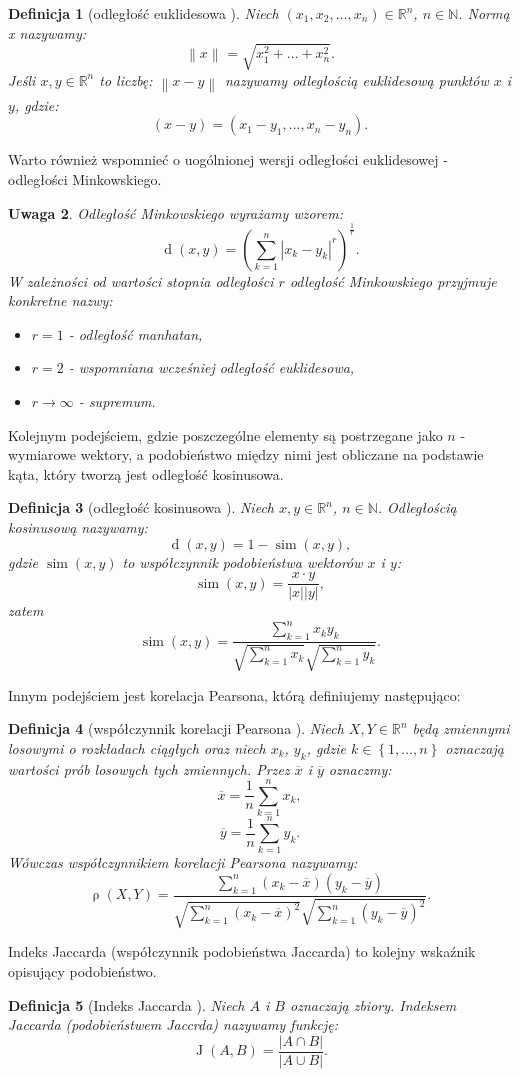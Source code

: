 \documentclass[12pt,a4paper]{report}
\newtheorem{df}{Definicja}[chapter]
\newtheorem{uwaga}[df]{Uwaga}
\newcommand{\set}[1]{\left\lbrace {#1} \right\rbrace}
\newcommand{\setR}{\mathbb{R}}
\newcommand{\setN}{\mathbb{N}}
\newcommand{\ro}[2]{\operatorname{\rho}\left( {#1},{#2} \right)}
\newcommand{\J}[2]{\operatorname{J}\left({#1}, {#2} \right)}
\newcommand{\similarity}[2]{\operatorname{sim}\left({#1}, {#2} \right)}
\newcommand{\distance}[2]{\operatorname{d}\left({#1}, {#2} \right)}
\newcommand{\norm}[2][]{\left\| {#2} \right\|_{#1}}
\begin{document}
\begin{df}[odległość euklidesowa \citep{rsh}]%

Niech $(x_1,x_2,\ldots,x_n) \in \setR^n $, $n \in\setN$.
Normą x nazywamy:
$$
\norm{x} = \sqrt{x_{1}^{2} + \ldots + x_{n}^{2}}.
$$
Jeśli $x,y \in \setR^n $ to liczbę:
$\norm{x-y}$ nazywamy odległością euklidesową punktów $x$ i $y$, gdzie:
$$
(x-y) = (x_1-y_1,\ldots ,x_n-y_n).
$$
\end{df}
Warto również wspomnieć o uogólnionej wersji odległości euklidesowej - odległości Minkowskiego.
\begin{uwaga}
Odległość Minkowskiego wyrażamy wzorem:
$$
\distance{x}{y} = (\sum_{k=1}^n|x_k-y_k|^r)^{\frac{1}{r}}.
$$
W zależności od wartości stopnia odległości $r$ odległość Minkowskiego przyjmuje konkretne nazwy:
\begin{itemize}
\item $r=1$ - odległość manhatan,
\item $r=2$ - wspomniana wcześniej odległość euklidesowa,
\item $r \longrightarrow \infty $ - supremum. 
\end{itemize}
\end{uwaga}
Kolejnym podejściem, gdzie poszczególne elementy są postrzegane jako $n$ - wymiarowe wektory, a podobieństwo między nimi jest obliczane na podstawie kąta, który tworzą jest odległość kosinusowa.

\begin{df}[odległość kosinusowa \citep{rsh}] %
Niech $x,y \in \setR^n $, $n \in\setN$. Odległością kosinusową nazywamy:
$$
\distance{x}{y} = 1 - \similarity{x}{y},
$$ 
gdzie $\similarity{x}{y}$ to współczynnik podobieństwa wektorów $x$ i $y$:
$$
\similarity{x}{y} = \frac{x \cdot y}{|x||y|},
$$
zatem
$$
\similarity{x}{y} = \frac{\sum_{k=1}^n x_k y_k}{\sqrt{\sum_{k=1}^n x_k}\sqrt{\sum_{k=1}^n y_k}}.
$$
\end{df}
Innym podejściem jest korelacja Pearsona, którą definiujemy następująco:
\begin{df}[współczynnik korelacji Pearsona \citep{rsh}]

Niech $X,Y \in \setR^n$ będą zmiennymi losowymi o rozkładach ciągłych oraz niech $x_k$, $y_k$, gdzie $k\in\set{1, \ldots, n}$  oznaczają wartości prób losowych tych zmiennych. 
Przez $\overline{x}$ i $\overline{y}$ oznaczmy:
$$
\overline{x}=\frac{1}{n} \sum_{k=1}^n x_k,
$$
$$
\overline{y}=\frac{1}{n} \sum_{k=1}^n y_k.
$$
Wówczas współczynnikiem korelacji Pearsona nazywamy:
$$
\ro{X}{Y} = \frac{\sum_{k=1}^n(x_k - \overline{x})(y_k - \overline{y})}{\sqrt{\sum_{k=1}^n(x_k - \overline{x})^2} \sqrt{\sum_{k=1}^n(y_k - \overline{y})^2 }}.
$$
\end{df}
Indeks Jaccarda (współczynnik podobieństwa Jaccarda) to kolejny wskaźnik opisujący podobieństwo. 
\begin{df}[Indeks Jaccarda  \citep{bre}]
Niech $A$ i $B$ oznaczają zbiory. Indeksem Jaccarda (podobieństwem Jaccrda) nazywamy funkcję:
$$
\J{A}{B}=\frac{|A\cap B|}{|A \cup B|}.
$$
\end{df}
\end{document}
